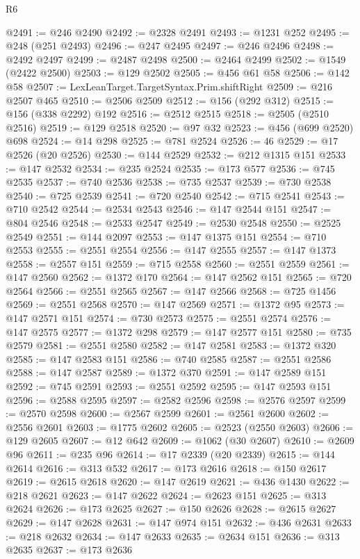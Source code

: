 \begin{lexlean}{R6}
\begin{coremodule}
@2491 := @246 @2490
@2492 := @2328 @2491
@2493 := @1231 @252
@2495 := @248 (@251 @2493)
@2496 := @247 @2495
@2497 := @246 @2496
@2498 := @2492 @2497
@2499 := @2487 @2498
@2500 := @2464 @2499
@2502 := @1549 (@2422 @2500)
@2503 := @129 @2502
@2505 := @456 @61 @58
@2506 := @142 @58
@2507 := LexLeanTarget.TargetSyntax.Prim.shiftRight
@2509 := @216 @2507 @465
@2510 := @2506 @2509
@2512 := @156 (@292 @312)
@2515 := @156 (@338 @2292) @192
@2516 := @2512 @2515
@2518 := @2505 (@2510 @2516)
@2519 := @129 @2518
@2520 := @97 @32
@2523 := @456 (@699 @2520) @698
@2524 := @14 @298
@2525 := @781 @2524
@2526 := 46
@2529 := @17 @2526 (@20 @2526)
@2530 := @144 @2529
@2532 := @212 @1315 @151
@2533 := @147 @2532
@2534 := @235 @2524
@2535 := @173 @577
@2536 := @745 @2535
@2537 := @740 @2536
@2538 := @735 @2537
@2539 := @730 @2538
@2540 := @725 @2539
@2541 := @720 @2540
@2542 := @715 @2541
@2543 := @710 @2542
@2544 := @2534 @2543
@2546 := @147 @2544 @151
@2547 := @804 @2546
@2548 := @2533 @2547
@2549 := @2530 @2548
@2550 := @2525 @2549
@2551 := @144 @2097
@2553 := @147 @1375 @151
@2554 := @710 @2553
@2555 := @2551 @2554
@2556 := @147 @2555
@2557 := @147 @1373
@2558 := @2557 @151
@2559 := @715 @2558
@2560 := @2551 @2559
@2561 := @147 @2560
@2562 := @1372 @170
@2564 := @147 @2562 @151
@2565 := @720 @2564
@2566 := @2551 @2565
@2567 := @147 @2566
@2568 := @725 @1456
@2569 := @2551 @2568
@2570 := @147 @2569
@2571 := @1372 @95
@2573 := @147 @2571 @151
@2574 := @730 @2573
@2575 := @2551 @2574
@2576 := @147 @2575
@2577 := @1372 @298
@2579 := @147 @2577 @151
@2580 := @735 @2579
@2581 := @2551 @2580
@2582 := @147 @2581
@2583 := @1372 @320
@2585 := @147 @2583 @151
@2586 := @740 @2585
@2587 := @2551 @2586
@2588 := @147 @2587
@2589 := @1372 @370
@2591 := @147 @2589 @151
@2592 := @745 @2591
@2593 := @2551 @2592
@2595 := @147 @2593 @151
@2596 := @2588 @2595
@2597 := @2582 @2596
@2598 := @2576 @2597
@2599 := @2570 @2598
@2600 := @2567 @2599
@2601 := @2561 @2600
@2602 := @2556 @2601
@2603 := @1775 @2602
@2605 := @2523 (@2550 @2603)
@2606 := @129 @2605
@2607 := @12 @642
@2609 := @1062 (@30 @2607)
@2610 := @2609 @96
@2611 := @235 @96
@2614 := @17 @2339 (@20 @2339)
@2615 := @144 @2614
@2616 := @313 @532
@2617 := @173 @2616
@2618 := @150 @2617
@2619 := @2615 @2618
@2620 := @147 @2619
@2621 := @436 @1430
@2622 := @218 @2621
@2623 := @147 @2622
@2624 := @2623 @151
@2625 := @313 @2624
@2626 := @173 @2625
@2627 := @150 @2626
@2628 := @2615 @2627
@2629 := @147 @2628
@2631 := @147 @974 @151
@2632 := @436 @2631
@2633 := @218 @2632
@2634 := @147 @2633
@2635 := @2634 @151
@2636 := @313 @2635
@2637 := @173 @2636

\end{coremodule}
\end{lexlean}
